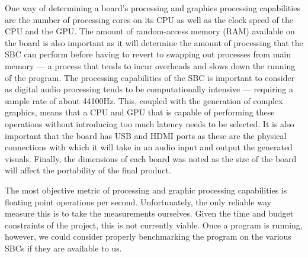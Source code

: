\documentclass[../initial_thesis.tex]{subfiles}
\begin{document}
One way of determining a board's processing and graphics processing capabilities are the number of processing cores on its CPU as well as the clock speed of the CPU and the GPU. The amount of random-access memory (RAM) available on the board is also important as it will determine the amount of processing that the SBC can perform before having to revert to swapping out processes from main memory --- a process that tends to incur overheads and slows down the running of the program. The processing capabilities of the SBC is important to consider as digital audio processing tends to be computationally intensive --- requiring a sample rate of about 44100Hz. This, coupled with the generation of complex graphics, means that a CPU and GPU that is capable of performing these operations without introducing too much latency needs to be selected. It is also important that the board has USB and HDMI ports as these are the physical connections with which it will take in an audio input and output the generated visuals. Finally, the dimensions of each board was noted as the size of the board will affect the portability of the final product. \par

The most objective metric of processing and graphic processing capabilities is floating point operations per second. Unfortunately, the only reliable way measure this is to take the measurements ourselves. Given the time and budget constraints of the project, this is not currently viable. Once a program is running, however, we could consider properly benchmarking the program on the various SBCs if they are available to us.
\end{document}
